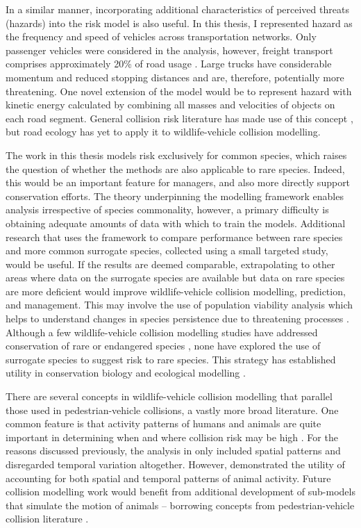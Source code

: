 In a similar manner, incorporating additional characteristics of perceived threats (hazards) into the risk model is also useful. In this thesis, I represented hazard as the frequency and speed of vehicles across transportation networks. Only passenger vehicles were considered in the analysis, however, freight transport comprises approximately 20\% of road usage \citep{abs16}. Large trucks have considerable momentum and reduced stopping distances and are, therefore, potentially more threatening. One novel extension of the model would be to represent hazard with kinetic energy calculated by combining all masses and velocities of objects on each road segment. General collision risk literature has made use of this concept \citep{aart06}, but road ecology has yet to apply it to wildlife-vehicle collision modelling.

The work in this thesis models risk exclusively for common species, which raises the question of whether the methods are also applicable to rare species. Indeed, this would be an important feature for managers, and also more directly support conservation efforts. The theory underpinning the modelling framework enables analysis irrespective of species commonality, however, a primary difficulty is obtaining adequate amounts of data with which to train the models. Additional research that uses the framework to compare performance between rare species and more common surrogate species, collected using a small targeted study, would be useful. If the results are deemed comparable, extrapolating to other areas where data on the surrogate species are available but data on rare species are more deficient would improve wildlife-vehicle collision modelling, prediction, and management. This may involve the use of population viability analysis which helps to understand changes in species persistence due to threatening processes \citep{rhod14}. Although a few wildlife-vehicle collision modelling studies have addressed conservation of rare or endangered species \citep{dwye16}, none have explored the use of surrogate species to suggest risk to rare species. This strategy has established utility in conservation biology \citep{caro99} and ecological modelling \citep{weng08}.

There are several concepts in wildlife-vehicle collision modelling that parallel those used in pedestrian-vehicle collisions, a vastly more broad literature. One common feature is that activity patterns of humans and animals are quite important in determining when and where collision risk may be high \citep{mira11,lao11}. For the reasons discussed previously, the analysis in  only included spatial patterns and disregarded temporal variation altogether. However,  demonstrated the utility of accounting for both spatial and temporal patterns of animal activity. Future collision modelling work would benefit from additional development of sub-models that simulate the motion of animals \citep[see][]{jaar07} -- borrowing concepts from pedestrian-vehicle collision literature \citep[see][]{lohn10}.

